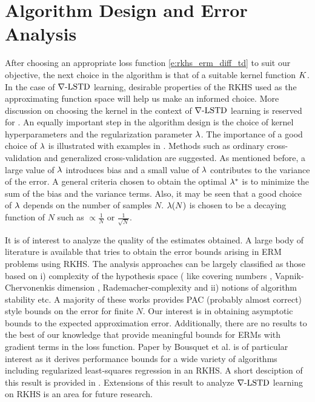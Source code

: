 \section{Algorithm Design and Error Analysis}
\label{s:error_analysis}
After choosing an appropriate loss function \eqref{e:rkhs_erm_diff_td} to suit our objective, the next choice in the algorithm is that of a suitable kernel function $K$. In the case of $\nabla\text{-LSTD}$ learning, desirable properties of the RKHS used as the approximating function space will help us make an informed choice.   More discussion on choosing the kernel in the context of $\nabla\text{-LSTD}$ learning is reserved for . An equally important step in the algorithm design is the choice of kernel hyperparameters and the regularization parameter $\lambda$. The importance of a good choice of $\lambda$ is illustrated with examples in \cite{wah90}. Methods such as ordinary cross-validation and generalized cross-validation are suggested. As mentioned before, a large value of $\lambda$ introduces bias and a small value of $\lambda$ contributes to the variance of the error. A general criteria chosen to obtain the optimal $\lambda^*$ is to minimize the sum of the bias and the variance terms. Also, it may be seen that a good choice of $\lambda$  depends on the number of samples $N$. $\lambda(N)$ is chosen to be a decaying function of $N$ such as $\propto \frac{1}{N}$ or $\frac{1}{\sqrt{N}}$. 



It is of interest to analyze the quality of the estimates obtained. A large body of literature is available that tries to obtain the error bounds arising in ERM problems using RKHS. The analysis approaches can be largely classified as those based on i) complexity of the hypothesis space ( like covering numbers \cite{zhou02, zhou03, smazhou03}, Vapnik-Chervonenkis dimension \cite{gir95}, Rademacher-complexity \cite{cormohros10,micponwuzho16} and ii) notions of algorithm stability \cite{boueli01,boueli02} etc. A majority of these works provides PAC (probably almost correct) style bounds on the error for finite $N$.  Our interest is in obtaining asymptotic bounds to the expected approximation error.  Additionally, there are no results to the best of our knowledge that provide meaningful bounds for ERMs with gradient terms in the loss function. Paper by Bousquet et al. \cite{boueli02} is of particular interest as it derives performance bounds for a wide variety of algorithms including regularized least-squares regression in an RKHS. A short desciption of this result is provided in . Extensions of this result to analyze $\nabla\text{-LSTD}$ learning on RKHS is an area for future research. 

